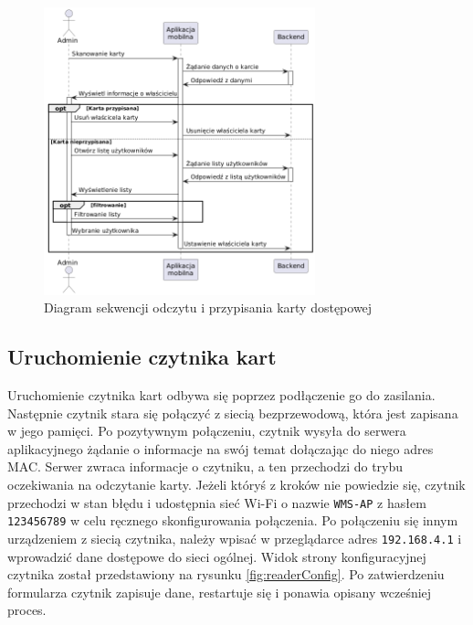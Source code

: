 \begin{figure}[H]
    \centering
    \includegraphics[width=0.7\textwidth]{graf/cardSeq.png}
    \caption{Diagram sekwencji odczytu i przypisania karty dostępowej}
    \label{fig:assignCard}
\end{figure}

\subsection{Uruchomienie czytnika kart}

Uruchomienie czytnika kart odbywa się poprzez podłączenie go do zasilania. Następnie czytnik stara się połączyć z siecią bezprzewodową, która jest zapisana w jego pamięci. Po pozytywnym połączeniu, czytnik wysyła do serwera aplikacyjnego żądanie o informacje na swój temat dołączając do niego adres MAC. Serwer zwraca informacje o czytniku, a ten przechodzi do trybu oczekiwania na odczytanie karty. Jeżeli któryś z kroków nie powiedzie się, czytnik przechodzi w stan błędu i udostępnia sieć Wi-Fi o nazwie \texttt{WMS-AP} z hasłem \texttt{123456789} w celu ręcznego skonfigurowania połączenia. Po połączeniu się innym urządzeniem z siecią czytnika, należy wpisać w przeglądarce adres \texttt{192.168.4.1} i wprowadzić dane dostępowe do sieci ogólnej. Widok strony konfiguracyjnej czytnika został przedstawiony na rysunku \ref{fig:readerConfig}. Po zatwierdzeniu formularza czytnik zapisuje dane, restartuje się i ponawia opisany wcześniej proces.

